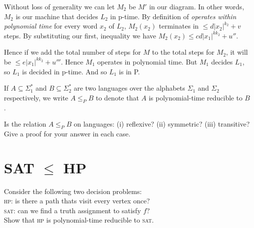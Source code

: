 Without loss of generality we can let $M_2$ be $M'$ in our diagram. 
In other words, $M_2$ is our machine that decides $L_2$ in p-time. 
By definition of \textit{operates within polynomial time} for every word $x_2$ of $L_2$,
$M_2(x_2)$ terminates in $\leqslant d|x_2|^{k_2} + v$ steps.
By substituting our first, inequality we have $M_2(x_2) \leqslant cd|x_1|^{k k_2} + u''$. 

Hence if we add the total number of steps for $M$ to the total steps for $M_2$, 
it will be $\leqslant e|x_1|^{k k_2} + u'''$. Hence $M_1$ operates in polynomial time. 
But $M_1$ decides $L_1$, so $L_1$ is decided in p-time. And so $L_1$ is in P.

\frmrule




\begin{example}
If  $A \subseteq \Sigma^{*}_1$ and $B \subseteq \Sigma^{*}_2$
are two languages over the alphabets $\Sigma_1$ and $\Sigma_2$ respectively,
we write $A \leqslant_P B$ to denote that $A$ is polynomial-time reducible to $B$.

Is the relation $A \leqslant_P B$ on languages:
(i) reflexive? (ii) symmetric? (iii) transitive?
Give a proof for your answer in each case.
\end{example}

\frmrule




\section{SAT $\leqslant$ HP}



Consider the following two decision problems:\\
\textsc{hp}: is there a path thats visit every vertex once? \\
\textsc{sat}: can we find a truth assignment to satisfy $f$? \\
Show that \textsc{hp} is polynomial-time reducible to \textsc{sat}.



